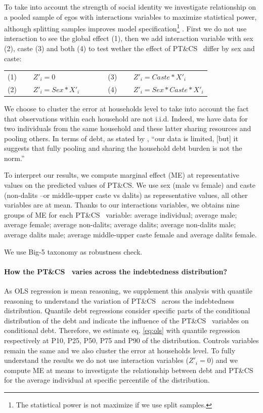 \documentclass[a4paper, 11pt, onecolumn]{article}
\newcommand{\PTCS}{PT\&CS}
\begin{document}
To take into account the strength of social identity we investigate relationship on a pooled sample of egos with interactions variables to maximize statistical power, although splitting samples improves model specification\footnote{The statistical power is not maximize if we use split samples.} .
First we do not use interaction to see the global effect (1), then we add interaction variable with sex (2), caste (3) and both (4) to test wether the effect of \PTCS~ differ by sex and caste:

\begin{table}[h!]
\centering
\begin{tabular}{lllll}
(1)~~~~ $Z'_{i}=0$ & & & & (3)~~~~ $Z'_{i}=Caste*X'_{i}$ \\
(2)~~~~ $Z'_{i}=Sex*X'_{i}$ & & & & (4)~~~~ $Z'_{i}=Sex*Caste*X'_{i}$ \\
\end{tabular}%
\end{table}%

We choose to cluster the error at households level to take into account the fact that observations within each household are not i.i.d.
Indeed, we have data for two individuals from the same household and these latter sharing resources and pooling others.%
In terms of debt, as stated by \cite{Reboul2021}, ``our data is limited, [but] it suggests that fully pooling and sharing the household debt burden is not the norm.''

To interpret our results, we compute marginal effect (ME) at representative values on the predicted values of \PTCS.%
We use sex (male vs female) and caste (non-dalits --or middle-upper caste vs dalits) as representative values, all other variables are at mean.
Thanks to our interactions variables, we obtains nine groups of ME for each \PTCS~ variable: average individual; average male; average female; average non-dalits; average dalits; average non-dalits male; average dalits male; average middle-upper caste female and average dalits female. 

We use Big-5 taxonomy as robustness check.

\paragraph{How the \PTCS~ varies across the indebtedness distribution?}
As OLS regression is mean reasoning, we supplement this analysis with quantile reasoning to understand the variation of \PTCS~ across the indebtedness distribution.
Quantile debt regressions consider specific parts of the conditional distribution of the debt and indicate the influence of the \PTCS~ variables on conditional debt.
Therefore, we estimate eq. \ref{eq:ols} with quantile regression respectively at P10, P25, P50, P75 and P90 of the distribution.
Controls variables remain the same and we also cluster the error at households level.
To fully understand the results we do not use interaction variables ($Z'_{i}=0$) and we compute ME at means to investigate the relationship between debt and \PTCS~ for the average individual at specific percentile of the distribution.
\end{document}
